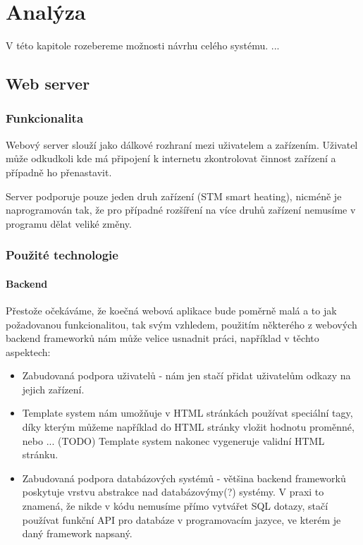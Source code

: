 \chapter{Analýza}

V této kapitole rozebereme možnosti návrhu celého systému.
...

\section{Web server}

\subsection{Funkcionalita}
Webový server slouží jako dálkové rozhraní mezi uživatelem a zařízením.
Uživatel může odkudkoli kde má připojení k internetu zkontrolovat činnost zařízení
a případně ho přenastavit.

Server podporuje pouze jeden druh zařízení (STM smart heating), nicméně je naprogramován
tak, že pro případné rozšíření na více druhů zařízení nemusíme v programu dělat veliké
změny.

\subsection{Použité technologie}

\subsubsection{Backend}
Přestože očekáváme, že koečná webová aplikace bude poměrně malá a to jak požadovanou funkcionalitou, tak svým
vzhledem, použitím některého z webových backend frameworků nám může velice usnadnit práci, například v těchto
aspektech:
\begin{itemize}
    \item Zabudovaná podpora uživatelů - nám jen stačí přidat uživatelům odkazy na jejich
        zařízení.
    \item Template system nám umožňuje v HTML stránkách používat speciální
        tagy, díky kterým můžeme například do HTML stránky vložit hodnotu proměnné, nebo ... (TODO)
        Template system nakonec vygeneruje validní HTML stránku.
    \item Zabudovaná podpora databázových systémů - většina backend frameworků poskytuje vrstvu abstrakce nad
        databázovýmy(?) systémy. V praxi to znamená, že nikde v kódu nemusíme přímo vytvářet SQL dotazy,
        stačí používat funkční API pro databáze v programovacím jazyce, ve kterém je daný framework napsaný.
\end{itemize}

